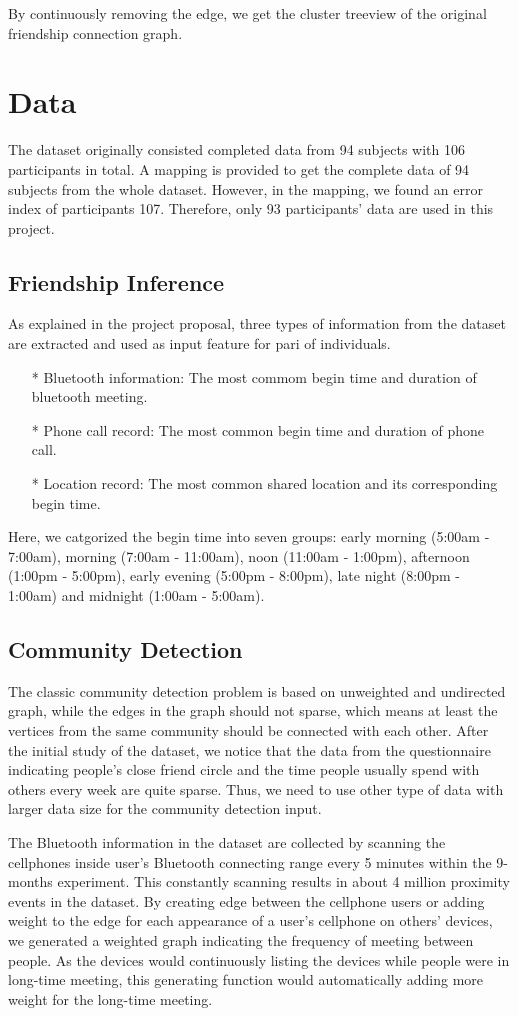 \documentclass[11pt]{article}
\begin{document}
By continuously removing the edge, we get the cluster treeview of the original friendship connection graph.

\section{Data}\label{sec2}
The dataset originally consisted completed data from 94 subjects with 106 participants in total. A mapping is provided to get the complete data of 94 subjects from the whole dataset. However, in the mapping, we found an error index of participants 107. Therefore, only 93 participants' data are used in this project. 
\subsection{Friendship Inference}
As explained in the project proposal, three types of information from the dataset are extracted and used as input feature for pari of individuals.
\begin{itemize}
\item[*] Bluetooth information: The most commom begin time and duration of bluetooth meeting. 
\item[*] Phone call record: The most common begin time and duration of phone call.
\item[*] Location record: The most common shared location and its corresponding begin time.
\end{itemize}
Here, we catgorized the begin time into seven groups: early morning (5:00am - 7:00am), morning (7:00am - 11:00am), noon (11:00am - 1:00pm), afternoon (1:00pm - 5:00pm), early evening (5:00pm - 8:00pm), late night (8:00pm - 1:00am) and midnight (1:00am - 5:00am).

\subsection{Community Detection}
The classic community detection problem is based on unweighted and undirected graph, while the edges in the graph should not sparse, which means at least the vertices from the same community should be connected with each other. 
After the initial study of the dataset, we notice that the data from the questionnaire indicating people's close friend circle and the time people usually spend with others every week are quite sparse. Thus, we need to use other type of data with larger data size for the community detection input.

The Bluetooth information in the dataset are collected by scanning the cellphones inside user's Bluetooth connecting range every 5 minutes within the 9-months experiment. This constantly scanning results in about 4 million proximity events in the dataset. By creating edge between the cellphone users or adding weight to the edge for each appearance of a user's cellphone on others' devices, we generated a weighted graph indicating the frequency of meeting between people. As the devices would continuously listing the devices while people were in long-time meeting, this generating function would automatically adding more weight for the long-time meeting.
\end{document}
